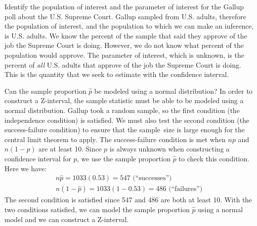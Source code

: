 \begin{examplewrap}
\begin{nexample}{Identify the population of interest and the parameter of interest for the Gallup poll about the U.S. Supreme Court. }
Gallup sampled from U.S. adults, therefore the population of interest, and the population to which we can make an inference, is U.S. adults.  We know the percent of the sample that said they approve of the job the Supreme Court is doing.  However, we do not know what percent of the population would approve.  The parameter of interest, which is unknown, is the percent of \emph{all} U.S. adults that approve of the job the Supreme Court is doing.  This is the quantity that we seek to estimate with the confidence interval.
\end{nexample}
\end{examplewrap}


\begin{examplewrap}
\begin{nexample}{Can the sample proportion $\hat{p}$ be modeled using a normal distribution?}
In order to construct a Z-interval, the sample statistic must be able to be modeled using a normal distribution.  Gallup took a random sample, so the first condition (the independence condition) is satisfied.  We must also test the second condition (the success-failure condition) to ensure that the sample~size is large enough for the central limit theorem to apply.  The success-failure condition is met when $np$ and $n(1-p)$ are at least 10. Since $p$ is always unknown when constructing a confidence interval for $p$, we use the sample proportion $\hat{p}$ to check this condition.  Here we have:
\begin{align*}
n\hat{p} = 1033(0.53) = 547\text{ (``successes'')} \\
 n(1-\hat{p}) = 1033(1 - 0.53) = 486\text{ (``failures'')}
\end{align*}
The second condition is satisfied since 547 and 486 are both at least 10. With the two conditions satisfied, we can model the sample proportion $\hat{p}$ using a normal model and we can construct a Z-interval.
\end{nexample}
\end{examplewrap}


